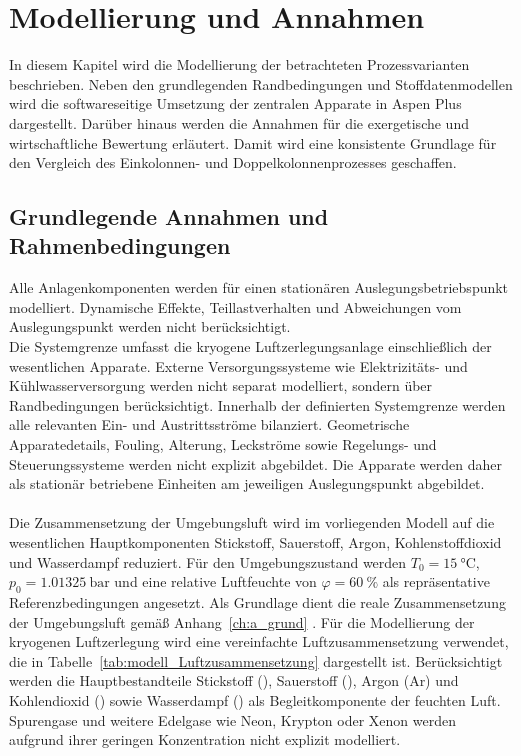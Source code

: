 \chapter{Modellierung und Annahmen}
\label{ch:modell}

In diesem Kapitel wird die Modellierung der betrachteten Prozessvarianten
beschrieben. Neben den grundlegenden Randbedingungen und Stoffdatenmodellen
wird die softwareseitige Umsetzung der zentralen Apparate in Aspen Plus
dargestellt. Darüber hinaus werden die Annahmen für die exergetische und
wirtschaftliche Bewertung erläutert. Damit wird eine konsistente Grundlage für
den Vergleich des Einkolonnen- und Doppelkolonnenprozesses geschaffen.

\section{Grundlegende Annahmen und Rahmenbedingungen}
\label{sec:modell_basic_assumptions}
Alle Anlagenkomponenten werden für einen stationären Auslegungsbetriebspunkt
modelliert. Dynamische Effekte, Teillastverhalten und Abweichungen vom Auslegungspunkt werden nicht berücksichtigt. \\
Die Systemgrenze umfasst die kryogene Luftzerlegungsanlage einschließlich der wesentlichen Apparate. Externe Versorgungssysteme wie Elektrizitäts- und Kühlwasserversorgung werden nicht separat modelliert, sondern über Randbedingungen berücksichtigt. Innerhalb der definierten Systemgrenze werden alle relevanten Ein- und Austrittsströme bilanziert. Geometrische Apparatedetails, Fouling, Alterung, Leckströme sowie Regelungs- und Steuerungssysteme werden nicht explizit abgebildet. Die Apparate werden daher als stationär betriebene Einheiten am jeweiligen Auslegungspunkt abgebildet.\\
\\
Die Zusammensetzung der Umgebungsluft wird im vorliegenden Modell auf die
wesentlichen Hauptkomponenten Stickstoff, Sauerstoff, Argon, Kohlenstoffdioxid
und Wasserdampf reduziert. Für den Umgebungszustand werden
\(T_0 = \SI{15}{\celsius}\), \(p_0 = \SI{1,01325}{\bar}\) und eine relative Luftfeuchte von \(\varphi = \SI{60}{\percent}\) als repräsentative Referenzbedingungen
angesetzt. Als Grundlage dient die reale Zusammensetzung der Umgebungsluft gemäß Anhang~\ref{ch:a_grund} \cite{hausenTieftemperaturtechnik1985, windmeierCryogenicTechnology2013}. Für die Modellierung der kryogenen Luftzerlegung wird eine vereinfachte Luftzusammensetzung verwendet, die in Tabelle~\ref{tab:modell_Luftzusammensetzung} dargestellt ist. Berücksichtigt werden die Hauptbestandteile Stickstoff (), Sauerstoff (), Argon (Ar) und Kohlendioxid () sowie Wasserdampf () als Begleitkomponente der feuchten Luft. Spurengase und weitere Edelgase wie Neon, Krypton oder Xenon werden aufgrund ihrer geringen Konzentration nicht explizit modelliert.\\
